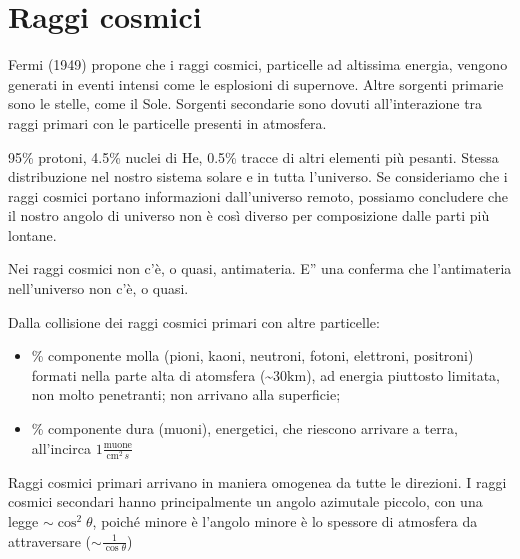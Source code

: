 \documentclass[letterpaper,10pt,italian]{jupyterBook}
\begin{document}
\section{Raggi cosmici}
\label{\detokenize{ch/modern/standard:raggi-cosmici}}
\sphinxAtStartPar
{} Fermi (1949) propone che i raggi cosmici, particelle ad altissima energia, vengono generati in eventi intensi come le esplosioni di supernove. Altre sorgenti primarie sono le stelle, come il Sole. Sorgenti secondarie sono dovuti all’interazione tra raggi primari con le particelle presenti in atmosfera.

\sphinxAtStartPar
{} 95\% protoni, 4.5\% nuclei di He, 0.5\% tracce di altri elementi più pesanti. Stessa distribuzione nel nostro sistema solare e in tutta l’universo. Se consideriamo che i raggi cosmici portano informazioni dall’universo remoto, possiamo concludere che il nostro angolo di universo non è così diverso per composizione dalle parti più lontane.

\sphinxAtStartPar
Nei raggi cosmici non c’è, o quasi, antimateria. E” una conferma che l’antimateria nell’universo non c’è, o quasi.

\sphinxAtStartPar
{} Dalla collisione dei raggi cosmici primari con altre particelle:
\begin{itemize}
\item {} 
\% componente molla (pioni, kaoni, neutroni, fotoni, elettroni, positroni) formati nella parte alta di atomsfera (\textasciitilde{}30km), ad energia piuttosto limitata, non molto penetranti; non arrivano alla superficie;

\item {} 
\% componente dura (muoni), energetici, che riescono arrivare a terra, all’incirca \(1 \frac{\text{muone}}{\text{cm}^2 \, s}\)

\end{itemize}

\sphinxAtStartPar
{} Raggi cosmici primari arrivano in maniera omogenea da tutte le direzioni. I raggi cosmici secondari hanno principalmente un angolo azimutale piccolo, con una legge \(\sim \cos^2 \theta\), poiché minore è l’angolo minore è lo spessore di atmosfera da attraversare (\(\sim \frac{1}{\cos \theta}\))
\end{document}
